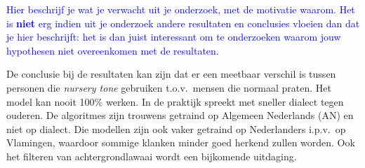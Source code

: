 \textcolor{blue}{Hier beschrijf je wat je verwacht uit je onderzoek, met de motivatie waarom. Het is \textbf{niet} erg indien uit je onderzoek andere resultaten en conclusies vloeien dan dat je hier beschrijft: het is dan juist interessant om te onderzoeken waarom jouw hypothesen niet overeenkomen met de resultaten.}

De conclusie bij de resultaten kan zijn dat er een meetbaar verschil is tussen personen die \textit{nursery tone} gebruiken t.o.v.\ mensen die normaal praten.
Het model kan nooit 100\% werken.
In de praktijk spreekt met sneller dialect tegen ouderen.
De algoritmes zijn trouwens getraind op Algemeen Nederlands (AN) en niet op dialect.
Die modellen zijn ook vaker getraind op Nederlanders i.p.v.\ op Vlamingen, waardoor sommige klanken minder goed herkend zullen worden.
Ook het filteren van achtergrondlawaai wordt een bijkomende uitdaging.

